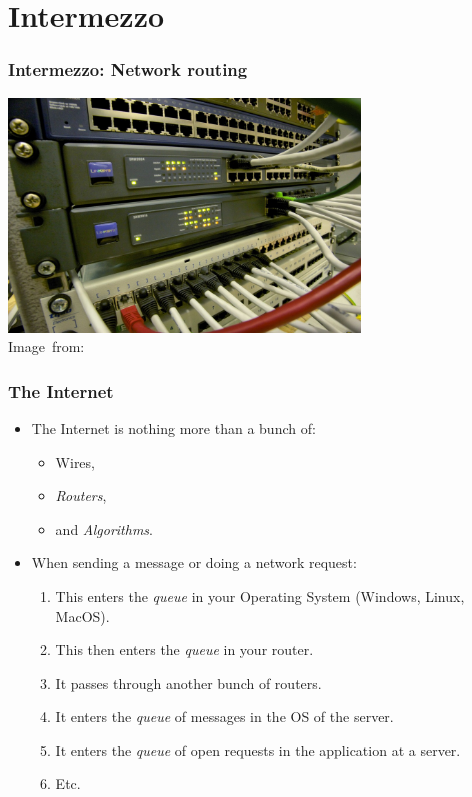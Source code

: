 \section{Intermezzo}
\label{sec:intermezzo}

\begin{frame}
	\frametitle{Intermezzo: Network routing}
	\begin{center}
		\includegraphics[width=0.7\textwidth]{figures/router.jpg}\\
		\hspace*{15pt}\hbox{\scriptsize Image from: }
	\end{center}
\end{frame}

\begin{frame}
	\frametitle{The Internet}

	\begin{itemize}
		\item The Internet is nothing more than a bunch of:
					\pause
			\begin{itemize}
				\item Wires,
					\pause
				\item \textit{Routers},
					\pause
				\item and \textit{Algorithms}.
			\end{itemize}
		\pause
		\item When sending a message or doing a network request:
			\begin{enumerate}
				\item This enters the \textit{queue} in your Operating System (Windows, Linux, MacOS).
					\pause
				\item This then enters the \textit{queue} in your router.
				\item It passes through another bunch of routers.
					\pause
				\item It enters the \textit{queue} of messages in the OS of the server.
					\pause
				\item It enters the \textit{queue} of open requests in the application at a server.
					\pause
				\item Etc.
			\end{enumerate}
	\end{itemize}
\end{frame}

